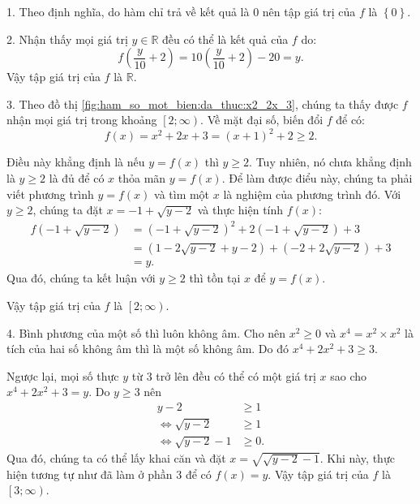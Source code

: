 \solution

1. Theo định nghĩa, do hàm chỉ trả về kết quả là $0$ nên tập giá trị của $f$ là $\left\{0\right\}$.

2. Nhận thấy mọi giá trị $y \in \mathbb{R}$ đều có thể là kết quả của $f$ do:
$$f\left(\frac{y}{10} + 2\right) = 10 \left(\frac{y}{10} + 2\right) - 20 = y.$$
Vậy tập giá trị của $f$ là $\mathbb{R}$.

3. Theo đồ thị \ref{fig:ham_so_mot_bien:da_thuc:x2_2x_3}, chúng ta thấy được $f$ nhận mọi giá trị trong khoảng $\left[2; \infty\right)$. Về mặt đại số, biến đổi $f$ để có:
$$f(x) = x^2 + 2x + 3 = (x + 1)^2 + 2 \geq 2.$$

Điều này khẳng định là nếu $y = f(x)$ thì $y \geq 2$. Tuy nhiên, nó chưa khẳng định là $y \geq 2$ là đủ để có $x$ thỏa mãn $y = f(x)$. Để làm được điểu này, chúng ta phải viết phương trình $y = f(x)$ và tìm một $x$ là nghiệm của phương trình đó. Với $y\geq 2$, chúng ta đặt $x = -1 + \sqrt{y - 2}$ và thực hiện tính $f(x)$:
\begin{align*}
   f\left(-1 + \sqrt{y - 2}\right) &= \left(-1 + \sqrt{y - 2}\right)^2 + 2\left(-1 + \sqrt{y - 2}\right) + 3 \\
   &= \left(1 - 2\sqrt{y - 2} + y - 2\right) + \left(- 2 + 2\sqrt{y - 2}\right) + 3 \\
   &= y.
\end{align*}
Qua đó, chúng ta kết luận với $y \geq 2$ thì tồn tại $x$ để $y = f(x)$.

Vậy tập giá trị của $f$ là $\left[2; \infty\right)$.

4. Bình phương của một số thì luôn không âm. Cho nên $x^2 \geq 0$ và $x^4 = x^2 \times x^2$ là tích của hai số không âm thì là một số không âm. Do đó $x^4 + 2x^2 + 3 \geq 3$.

Ngược lại, mọi số thực $y$ từ $3$ trở lên đều có thể có một giá trị $x$ sao cho $x^4 + 2x^2 + 3 = y$. Do $y \geq 3$ nên
\begin{align*}
   y - 2 &\geq 1 \\
   \iff \sqrt{y - 2} &\geq 1 \\
   \iff \sqrt{y - 2} - 1 &\geq 0.
\end{align*}
Qua đó, chúng ta có thể lấy khai căn và đặt $x = \sqrt{\sqrt{y - 2} - 1}$. Khi này, thực hiện tương tự như đã làm ở phần 3 để có $f(x) = y$. Vậy tập giá trị của $f$ là $\left[3; \infty\right)$.



